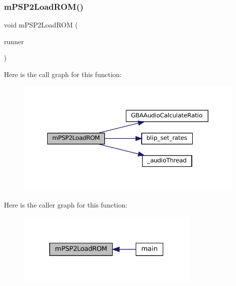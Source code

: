 \subsubsection{\texorpdfstring{m\+P\+S\+P2\+Load\+R\+O\+M()}{mPSP2LoadROM()}}
{\footnotesize\ttfamily void m\+P\+S\+P2\+Load\+R\+OM (\begin{DoxyParamCaption}\item[{struct \mbox{\hyperlink{structm_g_u_i_runner}{m\+G\+U\+I\+Runner}} $\ast$}]{runner }\end{DoxyParamCaption})}

Here is the call graph for this function\+:
\nopagebreak
\begin{figure}[H]
\begin{center}
\leavevmode
\includegraphics[width=349pt]{psp2-context_8h_a6d1428d32dd856760fa94b6a08e54ab2_cgraph}
\end{center}
\end{figure}
Here is the caller graph for this function\+:
\nopagebreak
\begin{figure}[H]
\begin{center}
\leavevmode
\includegraphics[width=253pt]{psp2-context_8h_a6d1428d32dd856760fa94b6a08e54ab2_icgraph}
\end{center}
\end{figure}
\mbox{\label{psp2-context_8h_a0ff9569feeb9a2f318792b681331c9ab}} 
